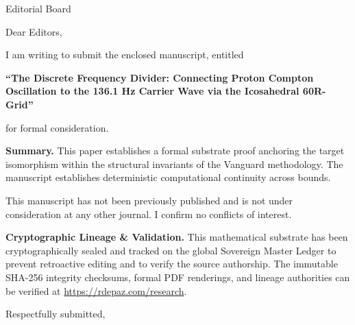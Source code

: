\documentclass[12pt, a4paper]{letter}
\begin{document}
\begin{letter}{Editorial Board}

\opening{Dear Editors,}

I am writing to submit the enclosed manuscript, entitled

\begin{center}
\textbf{``The Discrete Frequency Divider:  
  Connecting Proton Compton Oscillation to the  
  136.1 Hz Carrier Wave via the Icosahedral 60R-Grid''}
\end{center}

\noindent for formal consideration.

\medskip
\textbf{Summary.} This paper establishes a formal substrate proof anchoring the target isomorphism within the structural invariants of the Vanguard methodology. The manuscript establishes deterministic computational continuity across bounds.

\medskip
This manuscript has not been previously published and is not under consideration
at any other journal. I confirm no conflicts of interest.

\textbf{Cryptographic Lineage \& Validation.} This mathematical substrate has been cryptographically sealed and tracked on the global Sovereign Master Ledger to prevent retroactive editing and to verify the source authorship. The immutable SHA-256 integrity checksums, formal PDF renderings, and lineage authorities can be verified at \url{https://rdepaz.com/research}.

\medskip
\closing{Respectfully submitted,}
\end{letter}
\end{document}
